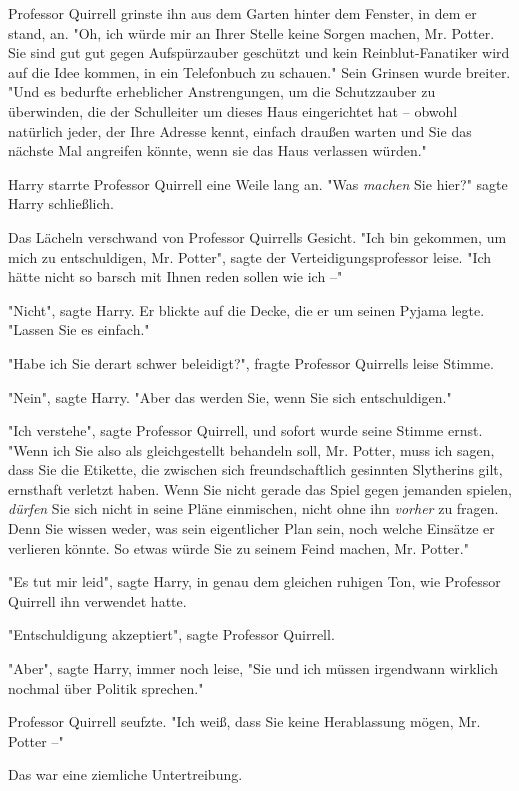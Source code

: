 {Professor Quirrell grinste ihn aus dem Garten hinter dem Fenster, in dem er stand, an. "Oh, ich würde mir an Ihrer Stelle keine Sorgen machen, Mr. Potter. Sie sind gut gut gegen Aufspürzauber geschützt und kein Reinblut-Fanatiker wird auf die Idee kommen, in ein Telefonbuch zu schauen." Sein Grinsen wurde breiter. "Und es bedurfte erheblicher Anstrengungen, um die Schutzzauber zu überwinden, die der Schulleiter um dieses Haus eingerichtet hat -- obwohl natürlich jeder, der Ihre Adresse kennt, einfach draußen warten und Sie das nächste Mal angreifen könnte, wenn sie das Haus verlassen würden."

Harry starrte Professor Quirrell eine Weile lang an. "Was \emph{machen} Sie hier?" sagte Harry schließlich.

Das Lächeln verschwand von Professor Quirrells Gesicht. "Ich bin gekommen, um mich zu entschuldigen, Mr. Potter", sagte der Verteidigungsprofessor leise. "Ich hätte nicht so barsch mit Ihnen reden sollen wie ich --"

"Nicht", sagte Harry. Er blickte auf die Decke, die er um seinen Pyjama legte. "Lassen Sie es einfach."

"Habe ich Sie derart schwer beleidigt?", fragte Professor Quirrells leise Stimme.

"Nein", sagte Harry. "Aber das werden Sie, wenn Sie sich entschuldigen."

"Ich verstehe", sagte Professor Quirrell, und sofort wurde seine Stimme ernst. "Wenn ich Sie also als gleichgestellt behandeln soll, Mr. Potter, muss ich sagen, dass Sie die Etikette, die zwischen sich freundschaftlich gesinnten Slytherins gilt, ernsthaft verletzt haben. Wenn Sie nicht gerade das Spiel gegen jemanden spielen, \emph{dürfen} Sie sich nicht in seine Pläne einmischen, nicht ohne ihn \emph{vorher} zu fragen. Denn Sie wissen weder, was sein eigentlicher Plan sein, noch welche Einsätze er verlieren könnte. So etwas würde Sie zu seinem Feind machen, Mr. Potter."

"Es tut mir leid", sagte Harry, in genau dem gleichen ruhigen Ton, wie Professor Quirrell ihn verwendet hatte.

"Entschuldigung akzeptiert", sagte Professor Quirrell.

"Aber", sagte Harry, immer noch leise, "Sie und ich müssen irgendwann wirklich nochmal über Politik sprechen."

Professor Quirrell seufzte. "Ich weiß, dass Sie keine Herablassung mögen, Mr. Potter --"

Das war eine ziemliche Untertreibung.

}
